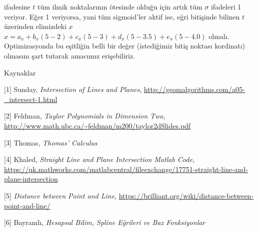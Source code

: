\documentclass[12pt,fleqn]{article}\usepackage{../../common}
\begin{document}
ifadesine $t$ tüm ilmik noktalarının ötesinde olduğu için artık tüm
$\sigma$ ifadeleri 1 veriyor. Eğer 1 veriyorsa, yani tüm sigmoid'ler aktif
ise, eğri bitişinde bilinen $t$ üzerinden elimizdeki $x$ 
$x = a_x + b_x(5-2) + c_x(5-3) + d_x(5-3.5) + e_x(5-4.0)$
olmalı. Optimizasyonda bu eşitliğin belli bir değer (istediğimiz bitiş
noktası kordinatı) olmasını şart tutarak amacımız erişebiliriz.

Kaynaklar

[1] Sunday, {\em Intersection of Lines and Planes}, 
\url{http://geomalgorithms.com/a05-_intersect-1.html}

[2] Feldman, {\em Taylor Polynomials in Dimension Two},
\url{http://www.math.ubc.ca/~feldman/m200/taylor2dSlides.pdf}

[3] Thomas, {\em Thomas' Calculus}

[4] Khaled, {\em Straight Line and Plane Intersection Matlab Code}, 
\url{https://uk.mathworks.com/matlabcentral/fileexchange/17751-straight-line-and-plane-intersection}

[5] {\em Distance between Point and Line}, 
\url{https://brilliant.org/wiki/distance-between-point-and-line/}

[6] Bayramlı, {\em Hesapsal Bilim, Spline Eğrileri ve Baz Fonksiyonlar}
\end{document}
